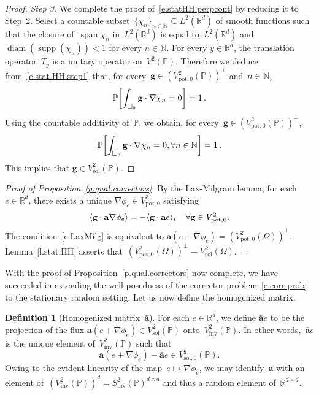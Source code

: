 \documentclass[11pt]{article} %
\let\oldsquare\square %
\renewcommand{\square}{\oldsquare}
\numberwithin{equation}{section}
\theoremstyle{definition}
\newtheorem{definition}[theorem]{Definition}
\let\originalleft\left
\let\originalright\right
\renewcommand{\left}{\mathopen{}\mathclose\bgroup\originalleft}
\renewcommand{\right}{\aftergroup\egroup\originalright}
\newcommand*{\N}{\ensuremath{\mathbb{N}}}
\newcommand*{\R}{\ensuremath{\mathbb{R}}}
\newcommand*{\Rd}{\ensuremath{\mathbb{R}^d}}
\newcommand{\g}{\mathbf{g}}
\newcommand{\pot}{\mathrm{pot}}
\newcommand{\sol}{\mathrm{sol}}
\newcommand{\inv}{\mathrm{inv}}
\renewcommand{\a}{\mathbf{a}}
\newcommand{\ahom}{\bar{\a}}
\newcommand{\cu}{\square}
\renewcommand{\P}{\mathbb{P}}
\DeclareMathOperator{\diam}{diam}
\DeclareMathOperator{\supp}{supp}
\DeclareMathOperator{\spn}{span}
\begin{document}
\begin{proof}
\smallskip

\emph{Step 3.} We complete the proof of~\eqref{e.statHH.perpcont} by reducing it to Step~2. Select a countable subset~$\{ \chi_n\}_{n\in\N} \subseteq L^2(\Rd)$ of smooth functions such that the closure of~$\spn \chi_n$ in~$L^2(\Rd)$ is equal to~$L^2(\Rd)$ and $\diam(\supp(\chi_n )) < 1$ for every $n\in\N$. For every $y\in\Rd$, the translation operator~$T_y$ is a unitary operator on~$V^2(\P)$. Therefore we deduce from~\eqref{e.stat.HH.step1} that, for every~$\g\in (V^2_{\pot,0}(\P))^\perp$ and~$n\in\N$, 
\begin{equation}
\P \left[ \int_{\cu_0} \g \cdot \nabla \chi_n =0 \right] = 1 \,. 
\end{equation}
Using the countable additivity of~$\P$, we obtain, for every~$\g\in (V^2_{\pot,0}(\P))^\perp$,
\begin{equation}
\P \left[  \int_{\cu_0} \g \cdot \nabla \chi_n =0, \forall n\in\N \right] = 1 \,. 
\end{equation}
This implies that $\g \in V^2_\sol(\P)$. 
\end{proof}



\begin{proof}[{Proof of Proposition~\ref{p.qual.correctors}}]
By the Lax-Milgram lemma, for each $e\in\Rd$, there exists a unique $\nabla \phi_e \in V^2_{\pot,0}$ satisfying 
\begin{equation}
\label{e.LaxMilg}
\left\langle \g \cdot \a \nabla \phi_e \right\rangle 
= 
-\langle \g \cdot \a e \rangle, \quad \forall \g \in V^2_{\pot,0}.
\end{equation}
The condition~\eqref{e.LaxMilg} is equivalent to $\a(e+\nabla \phi_e) =   (V^2_{\pot,0}(\Omega))^\perp$.
Lemma~\ref{l.stat.HH} asserts that~$(V^2_{\pot,0}(\Omega))^\perp = V^2_\sol(\Omega)$.
\end{proof}

With the proof of Proposition~\ref{p.qual.correctors} now complete, we have succeeded in extending the well-posedness of the corrector problem~\eqref{e.corr.prob} to the stationary random setting. Let us now define the homogenized matrix.

\begin{definition}[{Homogenized matrix~$\ahom$}]
For each $e\in\Rd$, we define $\ahom e$ to be the projection of the flux $\a(e+\nabla\phi_e) \in V^2_\sol(\P)$ onto~$V^2_{\inv}(\P)$. In other words,~$\ahom e$ is the unique element of~$V^2_{\inv}(\P)$ such that
\begin{equation}
\label{e.ahom.def.sec2}
\a(e+\nabla\phi_e) - \ahom e \in V^2_{\sol,0}(\P).
\end{equation}
Owing to the evident linearity of the map~$e\mapsto \nabla \phi_e$, we may identify~$\ahom$ with an element of~$(V^2_{\inv}(\P))^{d} = S^2_{\inv}(\P)^{d\times d}$ and thus a random element of~$\R^{d\times d}$.
\end{definition}
\end{document}
